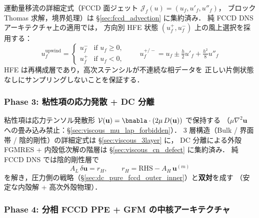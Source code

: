 運動量移流の詳細定式（FCCD 面ジェット $\mathcal{J}_f(u)=(u_f,u'_f,u''_f)$，
ブロック Thomas 求解，境界処理）は §\ref{sec:fccd_advection} に集約済み．
純 FCCD DNS アーキテクチャ上の適用では，
方向別 HFE 状態 $(u_f^+, u_f^-)$ 上の風上選択を採用する：
\begin{equation}
  u_f^\text{upwind}
    = \begin{cases}
        u_f^- & \text{if } u_f \ge 0,\\
        u_f^+ & \text{if } u_f < 0,
      \end{cases}
  \qquad
  u_f^{+/-} = u_f \pm \tfrac{h}{2}u'_f + \tfrac{h^2}{8}u''_f
  \label{eq:pure_fccd_hfe_upwind}
\end{equation}
HFE は再構成層であり，高次ステンシルが不連続な相データを
正しい片側状態なしにサンプリングしないことを保証する．

\subsubsection{Phase 3: 粘性項の応力発散 + DC 分離}
\label{sec:pure_fccd_phase3}

粘性項は応力テンソル発散形 $\mathcal{V}(\mathbf{u}) = \bnabla\cdot(2\mu\,D(\mathbf{u}))$ で保持する
（$\mu\nabla^2\mathbf{u}$ への畳み込み禁止：§\ref{sec:viscous_mu_lap_forbidden}）．
3 層構造（Bulk / 界面帯 / 陰的剛性）の詳細定式は §\ref{sec:viscous_3layer} に，
DC 分離による外殻 FGMRES + 内殻低次解の階層は §\ref{sec:viscous_cn_defect} に集約済み．
純 FCCD DNS では陰的剛性層で
\begin{equation}
  A_L\,\delta\mathbf{u} = r_H,
  \qquad r_H = \text{RHS} - A_H\,\mathbf{u}^{(m)}
  \label{eq:pure_fccd_viscous_dc}
\end{equation}
を解き，圧力側の戦略（§\ref{sec:dc_pure_fccd_outer_inner}）と\textbf{双対}を成す
（安定な内殻解 + 高次外殻物理）．

\subsubsection{Phase 4: 分相 FCCD PPE + GFM の中核アーキテクチャ}
\label{sec:pure_fccd_phase4}

